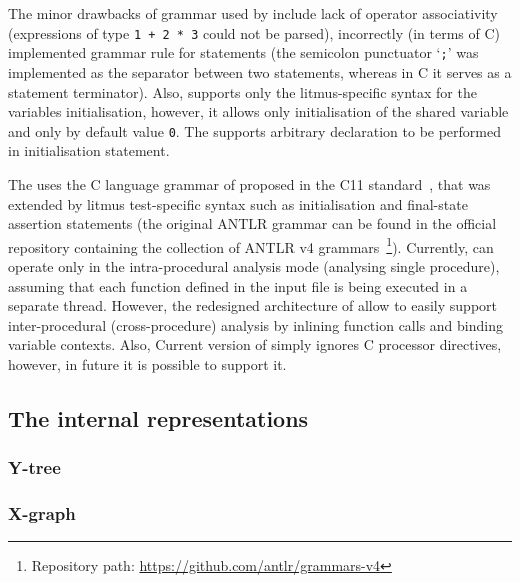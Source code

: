 The minor drawbacks of grammar used by \porthos[1] include lack of operator associativity (expressions of type \lstinline{1 + 2 * 3} could not be parsed), incorrectly (in terms of C) implemented grammar rule for statements (the semicolon punctuator `\lstinline{;}' was implemented as the separator between two statements, whereas in C it serves as a statement terminator). Also, \porthos[1] supports only the litmus-specific syntax for the variables initialisation, however, it allows only initialisation of the shared variable and only by default value \lstinline{0}. The \porthos[2] supports arbitrary declaration to be performed in initialisation statement.


The \porthos[2] uses the C language grammar of proposed in the C11 standard~\cite{jtc2011sc22}, that was extended by litmus test-specific syntax such as initialisation and final-state assertion statements (the original ANTLR grammar can be found in the official repository containing the collection of ANTLR v4 grammars~\footnote{Repository path: \url{https://github.com/antlr/grammars-v4}}).
Currently, \porthos[2] can operate only in the intra-procedural analysis mode (analysing single procedure), assuming that each function defined in the input file is being executed in a separate thread.
However, the redesigned architecture of \porthos[2] allow to easily support inter-procedural (cross-procedure) analysis by inlining function calls and binding variable contexts. Also, Current version of \porthos[2] simply ignores C processor directives, however, in future it is possible to support it.




\subsection{The internal representations}
\label{ch:impl:model}


\subsubsection{Y-tree}
\label{ch:impl:model:ytree}




\subsubsection{X-graph}
\label{ch:impl:model:xgraph}

